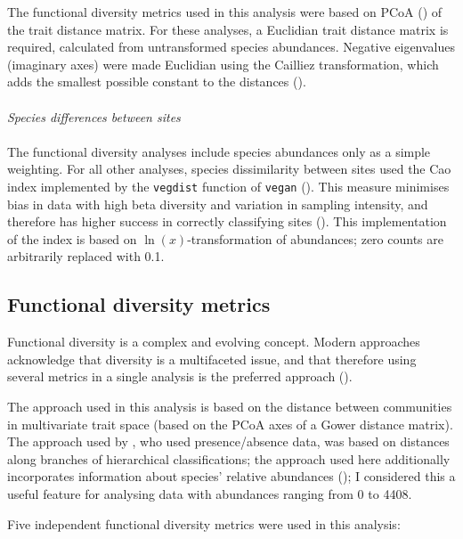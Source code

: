 \documentclass[12pt,a4paper,draft]{book}
\begin{document}
The functional diversity metrics used in this analysis were based on PCoA (\cite{Laliberte2010}) of the trait distance matrix. For these analyses, a Euclidian trait distance matrix is required, calculated from untransformed species abundances. Negative eigenvalues (imaginary axes) were made Euclidian using the Cailliez transformation, which adds the smallest possible constant to the distances (\cite{Laliberte2010}).\\
\\
\textit{Species differences between sites}\\
\\
The functional diversity analyses include species abundances only as a simple weighting. For all other analyses, species dissimilarity between sites used the Cao index implemented by the \texttt{vegdist} function of \texttt{vegan} (\cite{Oksanen2016}). This measure minimises bias in data with high beta diversity and variation in sampling intensity, and therefore has higher success in correctly classifying sites (\cite{Cao1997}). This implementation of the index is based on $\ln(x)$-transformation of abundances; zero counts are arbitrarily replaced with 0.1.

\subsection{Functional diversity metrics}

Functional diversity is a complex and evolving concept. Modern approaches acknowledge that diversity is a multifaceted issue, and that therefore using several metrics in a single analysis is the preferred approach (\cite{Laliberte2010}).

The approach used in this analysis is based on the distance between communities in multivariate trait space (based on the PCoA axes of a Gower distance matrix). The approach used by \cite{Mendez2012}, who used presence/absence data, was based on distances along branches of hierarchical classifications; the approach used here additionally incorporates information about species' relative abundances (\cite{Villeger2008}); I considered this a useful feature for analysing data with abundances ranging from 0 to 4408.

Five independent functional diversity metrics were used in this analysis:
\end{document}
